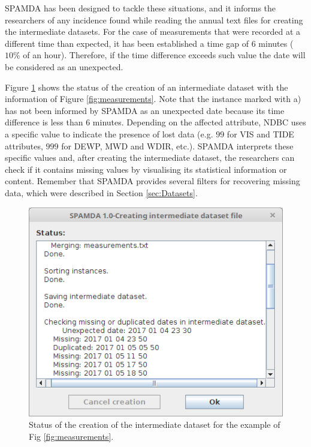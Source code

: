 \documentclass[energies,article,submit,moreauthors,pdftex]{Definitions/mdpi}
\begin{document}
		SPAMDA has been designed to tackle these situations, and it informs the researchers of any incidence found while reading the annual text files for creating the intermediate datasets. For the case of measurements that were recorded at a different time than expected, it has been established a time gap of 6 minutes ($10\%$ of an hour). Therefore, if the time difference exceeds such value the date will be considered as an unexpected.
		
		Figure \ref{fig:creatingDataset} shows the status of the creation of an intermediate dataset with the information of Figure \ref{fig:measurements}. Note that the instance marked with a) has not been informed by SPAMDA as an unexpected date because its time difference is less than $6$ minutes. Depending on the affected attribute, NDBC uses a specific value \cite{NOAA_3} to indicate the presence of lost data (e.g. $99$ for VIS and TIDE attributes, $999$ for DEWP, MWD and WDIR, etc.). SPAMDA interprets these specific values and, after creating the intermediate dataset, the researchers can check if it contains missing values by visualising its statistical information or content. Remember that SPAMDA provides several filters for recovering missing data, which were described in Section \ref{sec:Datasets}.
		
		\begin{figure}[H]
			\centering
			\includegraphics[scale=0.40]{figures/FigureCreatingDataset.png}
			\caption{Status of the creation of the intermediate dataset for the example of Fig \ref{fig:measurements}.}
			\label{fig:creatingDataset}
		\end{figure}
		
\end{document}
